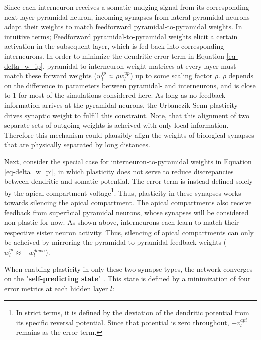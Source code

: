 Since each interneuron receives a somatic nudging signal from its corresponding next-layer pyramidal neuron, incoming
synapses from lateral pyramidal neurons adapt their weights to match feedforward pyramidal-to-pyramidal weights. In
intuitive terms; Feedforward pyramidal-to-pyramidal weights elicit a certain activation in the subsequent layer, which
is fed back into corresponding interneurons. In order to minimize the dendritic error term in Equation
\ref{eq-delta_w_ip}, pyramidal-to-interneuron weight matrices at every layer must match these forward weights ($w_l^{ip}
  \approx \rho w_l^{up}$) up to some scaling factor $\rho$. $\rho$ depends on the difference in parameters between
pyramidal- and interneurons, and is close to $1$ for most of the simulations considered here. As long as no feedback
information arrives at the pyramidal neurons, the Urbanczik-Senn plasticity drives synaptic weight to fulfill this
constraint. Note, that this alignment of two separate sets of outgoing weights is acheived with only local information.
Therefore this mechanism could plausibly align the weights of biological synapses that are physically separated by long
distances. \newline

Next, consider the special case for interneuron-to-pyramidal weights in Equation \ref{eq-delta_w_pi}, in which
plasticity does not serve to reduce discrepancies between dendritic and somatic potential. The error term is instead
defined solely by the apical compartment voltage\footnote{In strict terms, it is defined by the deviation of the
dendritic potential from its specific reversal potential. Since that potential is zero throughout, $- v_l^{api}$ remains
as the error term.}. Thus, plasticity in these synapses works towards silencing the apical compartment. The apical
compartments also receive feedback from superficial pyramidal neurons, whose synapses will be considered non-plastic for
now. As shown above, interneurons each learn to match their respective sister neuron activity. Thus, silencing of apical
compartments can only be acheived by mirroring the pyramidal-to-pyramidal feedback weights ($w_l^{pi} \approx
  -w_l^{down}$).\newline

When enabling plasticity in only these two synapse types, the network converges on the "\textbf{self-predicting state}"
\citep{sacramento2018dendritic}. This state is defined by a minimization of four error metrics at each hidden layer $l$:

